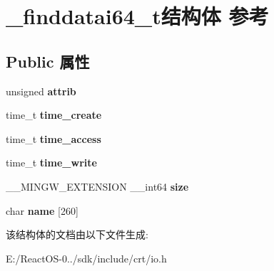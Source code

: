 \hypertarget{struct__finddatai64__t}{}\section{\+\_\+finddatai64\+\_\+t结构体 参考}
\label{struct__finddatai64__t}
\subsection*{Public 属性}
\begin{DoxyCompactItemize}
\item 
\mbox{\label{struct__finddatai64__t_a2a2d8e2ca770a6e4276b02a4c3f968fc}} 
unsigned {\bfseries attrib}
\item 
\mbox{\label{struct__finddatai64__t_a070857439d132f10b35716ad786c5769}} 
time\+\_\+t {\bfseries time\+\_\+create}
\item 
\mbox{\label{struct__finddatai64__t_a67ef7b3f624b1098dd2361df288a13e1}} 
time\+\_\+t {\bfseries time\+\_\+access}
\item 
\mbox{\label{struct__finddatai64__t_a78f80d8cb6b2cb8bf073bb4190390e18}} 
time\+\_\+t {\bfseries time\+\_\+write}
\item 
\mbox{\label{struct__finddatai64__t_ac46e9b5e281c30157f25917bfb172d6f}} 
\+\_\+\+\_\+\+M\+I\+N\+G\+W\+\_\+\+E\+X\+T\+E\+N\+S\+I\+ON \+\_\+\+\_\+int64 {\bfseries size}
\item 
\mbox{\label{struct__finddatai64__t_a3a82114f392865df2d47161c8cf35bff}} 
char {\bfseries name} \mbox{[}260\mbox{]}
\end{DoxyCompactItemize}


该结构体的文档由以下文件生成\+:\begin{DoxyCompactItemize}
\item 
E\+:/\+React\+O\+S-\/0../sdk/include/crt/io.\+h\end{DoxyCompactItemize}
